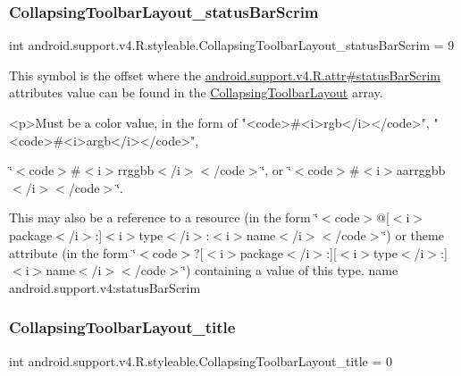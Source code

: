 \subsubsection{\texorpdfstring{Collapsing\+Toolbar\+Layout\+\_\+status\+Bar\+Scrim}{CollapsingToolbarLayout\_statusBarScrim}}
{\footnotesize\ttfamily int android.\+support.\+v4.\+R.\+styleable.\+Collapsing\+Toolbar\+Layout\+\_\+status\+Bar\+Scrim = 9\hspace{0.3cm}{\ttfamily [static]}}

This symbol is the offset where the \hyperlink{classandroid_1_1support_1_1v4_1_1R_1_1attr_aed3472edce6d14c66adbc8ad231aecff}{android.\+support.\+v4.\+R.\+attr\#status\+Bar\+Scrim} attribute\textquotesingle{}s value can be found in the \hyperlink{classandroid_1_1support_1_1v4_1_1R_1_1styleable_a91b20e27088c910353d38c1efde32aa9}{Collapsing\+Toolbar\+Layout} array.

\begin{DoxyVerb}      <p>Must be a color value, in the form of "<code>#<i>rgb</i></code>", "<code>#<i>argb</i></code>",
\end{DoxyVerb}
 \char`\"{}$<$code$>$\#$<$i$>$rrggbb$<$/i$>$$<$/code$>$\char`\"{}, or \char`\"{}$<$code$>$\#$<$i$>$aarrggbb$<$/i$>$$<$/code$>$\char`\"{}. 

This may also be a reference to a resource (in the form \char`\"{}$<$code$>$@\mbox{[}$<$i$>$package$<$/i$>$\+:\mbox{]}$<$i$>$type$<$/i$>$\+:$<$i$>$name$<$/i$>$$<$/code$>$\char`\"{}) or theme attribute (in the form \char`\"{}$<$code$>$?\mbox{[}$<$i$>$package$<$/i$>$\+:\mbox{]}\mbox{[}$<$i$>$type$<$/i$>$\+:\mbox{]}$<$i$>$name$<$/i$>$$<$/code$>$\char`\"{}) containing a value of this type.  name android.\+support.\+v4\+:status\+Bar\+Scrim \mbox{\label{classandroid_1_1support_1_1v4_1_1R_1_1styleable_aa433ebbb56ee0a51b7f7e167863bdd12}} 
\subsubsection{\texorpdfstring{Collapsing\+Toolbar\+Layout\+\_\+title}{CollapsingToolbarLayout\_title}}
{\footnotesize\ttfamily int android.\+support.\+v4.\+R.\+styleable.\+Collapsing\+Toolbar\+Layout\+\_\+title = 0\hspace{0.3cm}{\ttfamily [static]}}

